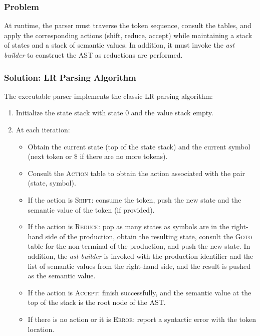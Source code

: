 \documentclass[12pt,a4paper]{report}
\begin{document}
\subsubsection{Problem}
At runtime, the parser must traverse the token sequence, consult the tables, and apply the corresponding actions (shift, reduce, accept)
while maintaining a stack of states and a stack of semantic values.
In addition, it must invoke the \textit{ast builder} to construct the AST as reductions are performed.

\subsubsection{Solution: LR Parsing Algorithm}
The executable parser implements the classic LR parsing algorithm:

\begin{enumerate}
    \item Initialize the state stack with state 0 and the value stack empty.
    \item At each iteration:
        \begin{itemize}
            \item Obtain the current state (top of the state stack) and the current symbol (next token or \$ if there are no more tokens).
            \item Consult the \textsc{Action} table to obtain the action associated with the pair (state, symbol).
            \item If the action is \textsc{Shift}: consume the token, push the new state and the semantic value of the token (if provided).
            \item If the action is \textsc{Reduce}: pop as many states as symbols are in the right-hand side of the production, obtain the resulting state, consult the \textsc{Goto} table for the non-terminal of the production, and push the new state.
            In addition, the \textit{ast builder} is invoked with the production identifier and the list of semantic values from the right-hand side, and the result is pushed as the semantic value.
            \item If the action is \textsc{Accept}: finish successfully, and the semantic value at the top of the stack is the root node of the AST.
            \item If there is no action or it is \textsc{Error}: report a syntactic error with the token location.
        \end{itemize}
\end{enumerate}
\end{document}
